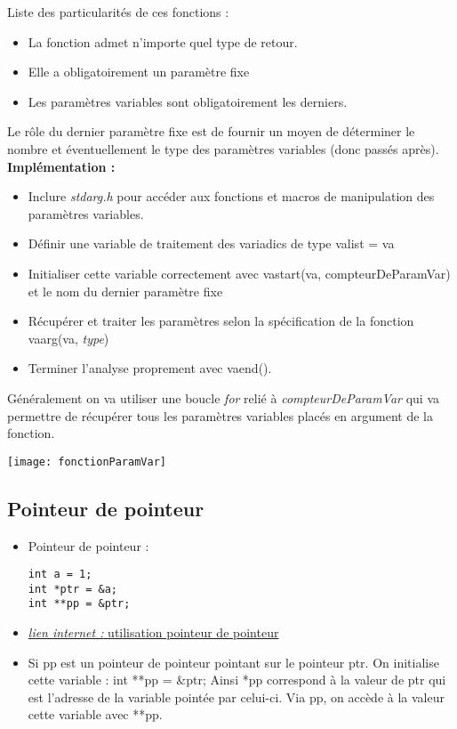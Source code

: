 \documentclass[12pt,a4paper]{article}
\begin{document}
\begin{itemize}
\newline Liste des particularités de ces fonctions : 
\begin{itemize}
\item La fonction admet n'importe quel type de retour. 
\item Elle a obligatoirement un paramètre fixe 
\item Les paramètres variables sont obligatoirement les derniers. 
\end{itemize}
Le rôle du dernier paramètre fixe est de fournir un moyen de déterminer le nombre et éventuellement le type des paramètres variables (donc passés après). 
\newline \textbf{Implémentation :}
\begin{itemize}
\item Inclure \textit{stdarg.h} pour accéder aux fonctions et macros de manipulation des paramètres variables. 
\item Définir une variable de traitement des variadics de type va\textunderscore list = va
\item Initialiser cette variable correctement avec va\textunderscore start(va, compteurDeParamVar) et le nom du dernier paramètre fixe 
\item Récupérer et traiter les paramètres selon la spécification de la fonction \\
va\textunderscore arg(va, \textit{type})
\item Terminer l'analyse proprement avec va\textunderscore end().
\end{itemize}
Généralement on va utiliser une boucle \textit{for} relié à \textit{compteurDeParamVar} qui va permettre de récupérer tous les paramètres variables placés en argument de la fonction.
\begin{center}
\texttt{[image: fonctionParamVar]}
\end{center}
\end{itemize}

\subsection{Pointeur de pointeur}
\begin{itemize}
\item Pointeur de pointeur : 
\begin{lstlisting}
int a = 1; 
int *ptr = &a; 
int **pp = &ptr;
\end{lstlisting}
\item \href{https://stackoverflow.com/questions/5580761/why-use-double-pointer-or-why-use-pointers-to-pointers}{\textit{lien internet : }utilisation pointeur de pointeur}
\item Si pp est un pointeur de pointeur pointant sur le pointeur ptr. On initialise cette variable : int **pp = \&ptr; Ainsi *pp correspond à la valeur de ptr qui est l'adresse de la variable pointée par celui-ci. Via pp, on accède à la valeur cette variable avec **pp.
\end{itemize}
\end{document}
